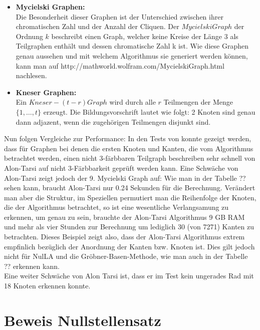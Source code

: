 \begin{itemize}
\item \textbf{Mycielski Graphen: }\\
Die Besonderheit dieser Graphen ist der Unterschied zwischen ihrer chromatischen Zahl und der Anzahl der Cliquen. Der $Mycielski Graph$ der Ordnung $k$ beschreibt einen Graph, welcher keine Kreise der Länge 3 als Teilgraphen enthält und dessen chromatische Zahl k ist. Wie diese Graphen genau aussehen und mit welchem Algorithmus sie generiert werden können, kann man auf http://mathworld.wolfram.com/MycielskiGraph.html nachlesen.
\item \textbf{Kneser Graphen: }\\
Ein $Kneser-(t-r) Graph$ wird durch alle $r$ Teilmengen der Menge $\{1,\ldots,t\}$ erzeugt. Die Bildungsvorschrift lautet wie folgt: 2 Knoten sind genau dann adjazent, wenn die zugehörigen Teilmengen disjunkt sind.
\end{itemize}


\noindent Nun folgen Vergleiche zur Performance: In den Tests von \cite{Loera2011} konnte gezeigt werden, dass für Graphen bei denen die ersten Knoten und Kanten, die vom Algorithmus betrachtet werden, einen nicht 3-färbbaren Teilgraph beschreiben sehr schnell von Alon-Tarsi auf nicht 3-Färbbarkeit geprüft werden kann. Eine Schwäche von Alon-Tarsi zeigt jedoch der 9. Mycielski Graph auf: Wie man in der Tabelle ?? sehen kann, braucht Alon-Tarsi nur 0.24 Sekunden für die Berechnung. Verändert man aber die Struktur, im Speziellen permutiert man die Reihenfolge der Knoten, die der Algorithmus betrachtet, so ist eine wesentliche Verlangsamung zu erkennen, um genau zu sein, brauchte der Alon-Tarsi Algorithmus 9 GB RAM und mehr als vier Stunden zur Berechnung um lediglich 30 (von 7271) Kanten zu betrachten. Dieses Beispiel zeigt also, dass der Alon-Tarsi Algorithmus extrem empfinlich bezüglich der Anordnung der Kanten bzw. Knoten ist. Dies gilt jedoch nicht für NulLA und die Gröbner-Basen-Methode, wie man auch in der Tabelle ?? erkennen kann.\\
Eine weiter Schwäche von Alon Tarsi ist, dass er im Test kein ungerades Rad mit 18 Knoten erkennen konnte.

\section{Beweis Nullstellensatz}

